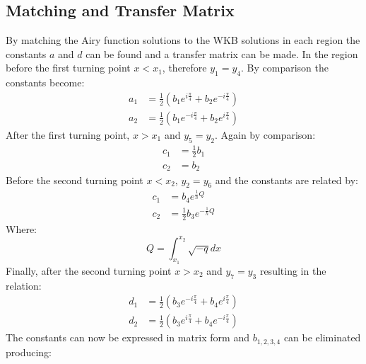 		\subsection{Matching and Transfer Matrix}
		\label{Appendix - Matching and Transfer Matrix}
		By matching the Airy function solutions to the WKB solutions in each region the constants $a$ and $d$ can be found and a transfer matrix can be made.
		In the region before the first turning point $x<x_{1}$, therefore $y_{1}=y_{4}$. By comparison the constants become:
		\begin{align}
			a_{1}&=\frac{1}{2}\left(b_{1}e^{i\frac{\pi}{4}}+b_{2}e^{-i\frac{\pi}{4}}\right)\\
			a_{2}&=\frac{1}{2}\left(b_{1}e^{-i\frac{\pi}{4}}+b_{2}e^{i\frac{\pi}{4}}\right)
		\end{align}
		After the first turning point, $x>x_{1}$ and $y_{5}=y_{2}$. Again by comparison:
		\begin{align}
			c_{1}&=\frac{1}{2}b_{1}\\
			c_{2}&=b_{2}
		\end{align}
		Before the second turning point $x<x_{2}$, $y_{2}=y_{6}$ and the constants are related by:
		\begin{align}
			c_{1}&=b_{4}e^{\frac{1}{h}Q}\\
			c_{2}&=\frac{1}{2}b_{3}e^{-\frac{1}{h}Q}
		\end{align}
		Where:
		\begin{equation}
			Q=\int_{x_{1}}^{x_{2}}\sqrt{-q}dx
		\end{equation}
		Finally, after the second turning point $x>x_{2}$ and $y_{7}=y_{3}$ resulting in the relation:
		\begin{align}
			d_{1}&=\frac{1}{2}\left(b_{3}e^{-i\frac{\pi}{4}}+b_{4}e^{i\frac{\pi}{4}}\right)\\
			d_{2}&=\frac{1}{2}\left(b_{3}e^{i\frac{\pi}{4}}+b_{4}e^{-i\frac{\pi}{4}}\right)
		\end{align}
		The constants can now be expressed in matrix form and $b_{1,2,3,4}$ can be eliminated producing:

